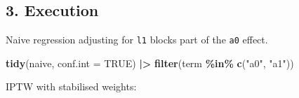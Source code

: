 \documentclass[
]{article}
\newenvironment{Shaded}{\begin{snugshade}}{\end{snugshade}}
\newcommand{\AttributeTok}[1]{\textcolor[rgb]{0.13,0.29,0.53}{#1}}
\newcommand{\ConstantTok}[1]{\textcolor[rgb]{0.56,0.35,0.01}{#1}}
\newcommand{\FunctionTok}[1]{\textcolor[rgb]{0.13,0.29,0.53}{\textbf{#1}}}
\newcommand{\NormalTok}[1]{#1}
\newcommand{\SpecialCharTok}[1]{\textcolor[rgb]{0.81,0.36,0.00}{\textbf{#1}}}
\newcommand{\StringTok}[1]{\textcolor[rgb]{0.31,0.60,0.02}{#1}}
\begin{document}
\subsection{3. Execution}\label{execution}

Naive regression adjusting for \texttt{l1} blocks part of the
\texttt{a0} effect.

\begin{Shaded}
\begin{Highlighting}[]
\FunctionTok{tidy}\NormalTok{(naive, }\AttributeTok{conf.int =} \ConstantTok{TRUE}\NormalTok{) }\SpecialCharTok{|\textgreater{}}
  \FunctionTok{filter}\NormalTok{(term }\SpecialCharTok{\%in\%} \FunctionTok{c}\NormalTok{(}\StringTok{"a0"}\NormalTok{, }\StringTok{"a1"}\NormalTok{))}
\end{Highlighting}
\end{Shaded}

IPTW with stabilised weights:
\end{document}
